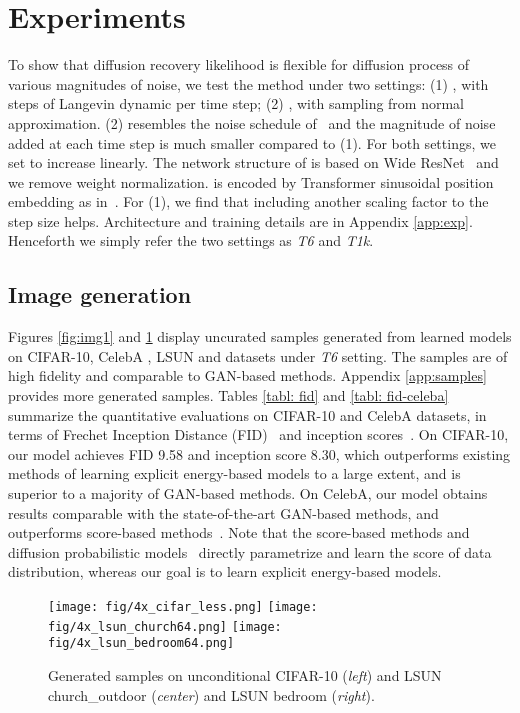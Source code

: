 \documentclass{article} \usepackage{iclr2021_conference,times}
\begin{document}
\section{Experiments}
To show that diffusion recovery likelihood is flexible for diffusion process of various magnitudes of noise, we test the method under two settings: (1) , with  steps of Langevin dynamic per time step; (2) , with sampling from normal approximation. (2) resembles the noise schedule of~\citet{ho2020denoising} and the magnitude of noise added at each time step is much smaller compared to (1). For both settings, we set  to increase linearly. The network structure of  is based on Wide ResNet~\citep{zagoruyko2016wide} and we remove weight normalization.  is encoded by Transformer sinusoidal position embedding as in~\citep{ho2020denoising}. For (1), we find that including another scaling factor  to the step size  helps. Architecture and training details are in Appendix \ref{app:exp}. Henceforth we simply refer the two settings as {\em T6} and {\em T1k}. 

\subsection{Image generation}
Figures \ref{fig:img1} and \ref{fig:img2} display uncurated samples generated from learned models on CIFAR-10, CelebA , LSUN  and  datasets under {\em T6} setting. The samples are of high fidelity and comparable to GAN-based methods. Appendix \ref{app:samples} provides more generated samples. Tables \ref{tabl: fid} and \ref{tabl: fid-celeba} summarize the quantitative evaluations on CIFAR-10 and CelebA datasets, in terms of Frechet Inception Distance (FID)~\citep{heusel2017gans} and inception scores~\citep{salimans2016improved}. On CIFAR-10, our model achieves FID 9.58 and inception score 8.30, which outperforms existing methods of learning explicit energy-based models to a large extent, and is superior to a majority of GAN-based methods. On CelebA, our model obtains results comparable with the state-of-the-art GAN-based methods, and outperforms score-based methods~\citep{song2019generative,song2020improved}.  Note that the score-based methods \citep{song2019generative,song2020improved} and diffusion probabilistic models~\citep{ho2020denoising} directly parametrize and learn the score of data distribution, whereas our goal is to learn explicit energy-based models. 
\begin{figure}[ht]
\begin{center}
\texttt{[image: fig/4x\_cifar\_less.png]}
\texttt{[image: fig/4x\_lsun\_church64.png]}
\texttt{[image: fig/4x\_lsun\_bedroom64.png]}
\end{center}
\caption{Generated samples on unconditional CIFAR-10 ({\em left}) and LSUN  church\_outdoor ({\em center}) and LSUN  bedroom ({\em right}).}
\label{fig:img2}
\end{figure}
\end{document}
